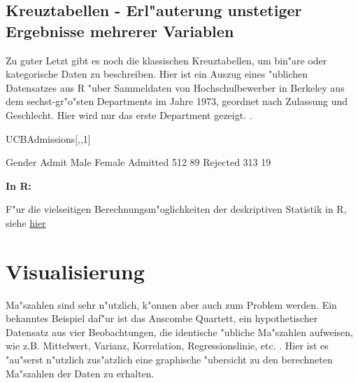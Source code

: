 \documentclass[a4paper,twoside]{tufte-book}\usepackage[]{graphicx}\usepackage[]{color}
\begin{document}
\subsection{Kreuztabellen - Erl"auterung unstetiger Ergebnisse mehrerer Variablen}

Zu guter Letzt gibt es noch die klassischen Kreuztabellen, um bin"are oder kategorische Daten zu beschreiben. Hier ist ein Auszug eines "ublichen Datensatzes aus R "uber Sammeldaten von Hochschulbewerber in Berkeley aus dem sechst-gr"o"sten Departments im Jahre 1973, geordnet nach Zulassung und Geschlecht. Hier wird nur das erste Department gezeigt.
.

\begin{Schunk}
\begin{Sinput}
UCBAdmissions[,,1]
\end{Sinput}
\begin{Soutput}
          Gender
Admit      Male Female
  Admitted  512     89
  Rejected  313     19
\end{Soutput}
\end{Schunk}


\vspace{1cm}
\begin{fullwidth}
\begin{mdframed}
    
\textbf{In R:} 

F"ur die vielseitigen Berechnungsm"oglichkeiten der deskriptiven Statistik in R, siehe \href{http://www.uni-kiel.de/psychologie/rexrepos/rerDescriptive.html}{hier}

\end{mdframed}
\end{fullwidth} 


\section{Visualisierung}


Ma"szahlen sind sehr n"utzlich, k"onnen aber auch zum Problem werden. Ein bekanntes Beispiel daf"ur ist das Anscombe Quartett, ein hypothetischer Datensatz aus vier Beobachtungen, die identische "ubliche Ma"szahlen aufweisen, wie z.B. Mittelwert, Varianz, Korrelation, Regressionslinie, etc. \citep{Anscombe-Graphsinstatistical-1973}. Hier ist es "au"serst n"utzlich zus"atzlich eine graphische "ubersicht zu den berechneten Ma"szahlen der Daten zu erhalten.
\end{document}
